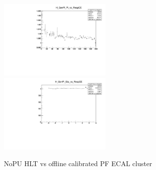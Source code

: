 \begin{figure}
\includegraphics[width=0.495\textwidth]{./plots_pdf/ECAL_plots/Prod6/NoPU/H_GenPi_Pt_vs_RespCE.pdf}
\includegraphics[width=0.495\textwidth]{./plots_pdf/ECAL_plots/Prod6/NoPU/H_GenPi_Eta_vs_RespCE.pdf}
\caption[HLT vs offline calibrated PF ECAL cluster for NoPU senario]{NoPU HLT vs offline calibrated PF ECAL cluster}
\label{fig:NoPU_ECAL_Offline_vs_Online_CE}
\end{figure}                                                                                                                                                                       

